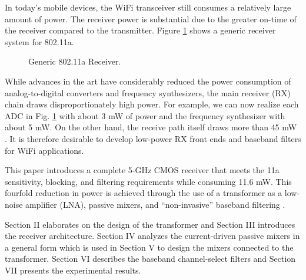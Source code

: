 In today's mobile devices, the WiFi transceiver still consumes a relatively large amount of power. 
The receiver power is substantial due to the greater on-time of the receiver compared to the transmitter.
Figure \ref{genericRX} shows a generic receiver system for 802.11a. 
\begin{figure}[htb]
\vspace{1.3in}
\caption{Generic 802.11a Receiver.}
\label{genericRX}
\end{figure}
While advances in the art have considerably reduced the power consumption of analog-to-digital converters and frequency synthesizers, the main
receiver (RX) chain draws disproportionately high power. For example, we can now realize each ADC in Fig. \ref{genericRX} with about 3 mW of power and
the frequency synthesizer with about 5 mW. On the other hand, the receive path itself draws more than 45 mW \cite{Kan}. It is therefore desirable to
develop low-power RX front ends and baseband filters for WiFi applications. 

This paper introduces a complete 5-GHz CMOS receiver that meets the 11a sensitivity, blocking, and filtering requirements while consuming 11.6 mW.
This fourfold reduction in power is achieved through the use of a transformer as a low-noise amplifier (LNA), passive mixers, and ``non-invasive''
baseband filtering \cite{Zolfaghari}.

Section II elaborates on the design of the transformer and Section III introduces the receiver architecture.
Section IV analyzes the current-driven passive mixers in a general form which is used in Section V to design the mixers connected to the transformer. 
Section VI describes the baseband channel-select filters and Section VII presents the experimental results.


 

